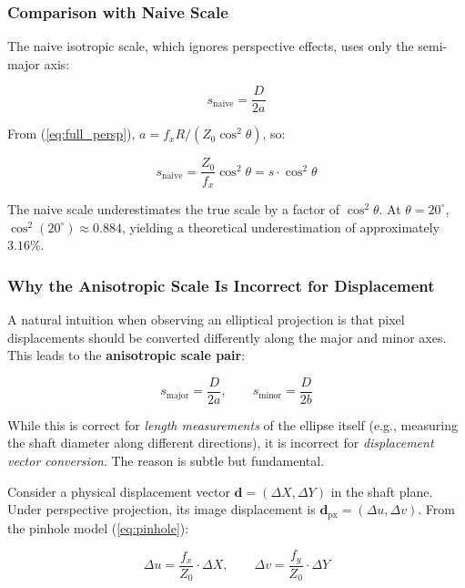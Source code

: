 \documentclass[journal]{IEEEtran}
\begin{document}
\subsubsection{Comparison with Naive Scale}

The naive isotropic scale, which ignores perspective effects, uses only the
semi-major axis:

\begin{equation}
s_{\text{naive}} = \frac{D}{2a}
\label{eq:naive}
\end{equation}

From (\ref{eq:full_persp}), $a = f_x R/(Z_0 \cos^{2}\theta)$, so:

\begin{equation}
s_{\text{naive}} = \frac{Z_0}{f_x} \cos^{2}\theta
= s \cdot \cos^{2}\theta
\label{eq:naive_error}
\end{equation}

The naive scale underestimates the true scale by a factor of $\cos^{2}\theta$.
At $\theta = 20^{\circ}$, $\cos^{2}(20^{\circ}) \approx 0.884$, yielding
a theoretical underestimation of approximately $3.16\%$.

\subsubsection{Why the Anisotropic Scale Is Incorrect for Displacement}

A natural intuition when observing an elliptical projection is that pixel
displacements should be converted differently along the major and minor axes.
This leads to the \textbf{anisotropic scale pair}:

\begin{equation}
s_{\text{major}} = \frac{D}{2a}, \qquad s_{\text{minor}} = \frac{D}{2b}
\label{eq:aniso_pair}
\end{equation}

While this is correct for \emph{length measurements} of the ellipse itself
(e.g., measuring the shaft diameter along different directions), it is
incorrect for \emph{displacement vector conversion}. The reason is subtle
but fundamental.

Consider a physical displacement vector $\mathbf{d} = (\Delta X, \Delta Y)$
in the shaft plane. Under perspective projection, its image displacement is
$\mathbf{d}_{\text{px}} = (\Delta u, \Delta v)$. From the pinhole model
(\ref{eq:pinhole}):

\begin{equation}
\Delta u = \frac{f_x}{Z_0} \cdot \Delta X, \qquad
\Delta v = \frac{f_y}{Z_0} \cdot \Delta Y
\label{eq:disp_proj}
\end{equation}
\end{document}
